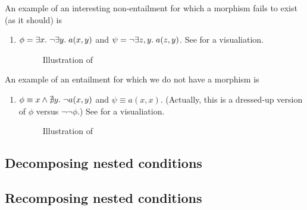 %
An example of an interesting non-entailment for which a morphism fails to exist (as it should) is
%
\begin{enumerate}[resume]
\item{} $\phi=\exists x.\; \neg\exists y.\; a(x,y)$ and $\psi=\neg\exists z,y.\;  a(z,y)$. See  for a visualiation.
  
  \begin{figure}
    \centering
%    
    \caption{Illustration of }
  \end{figure}
\end{enumerate}
%
An example of an entailment for which we do not have a morphism is
%
\begin{enumerate}[resume]
\item{} $\phi\equiv x\wedge \nexists y.\; \neg a(x,y)$ and $\psi\equiv a(x,x)$. (Actually, this is a dressed-up version of $\phi$ versus $\neg\neg\phi$.) See  for a visualiation.
  
  \begin{figure}
    \centering
%    
    \caption{Illustration of }
  \end{figure}
\end{enumerate}

\subsection{Decomposing nested conditions}

\subsection{Recomposing nested conditions}

